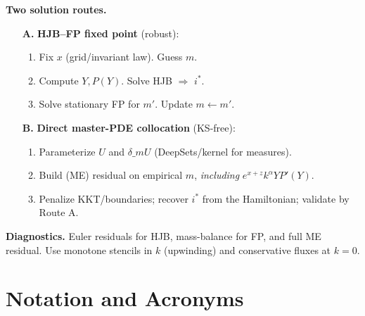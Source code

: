 \documentclass[11pt,letterpaper,oneside]{article}
\numberwithin{equation}{section}
\newcommand{\1}{\mathbf{1}}
\newcommand{\dmU}{\delta\_m U}
\begin{document}
\begin{tcolorbox}[didacticstyle]
\textbf{Two solution routes.}
\begin{enumerate}[leftmargin=1.25em]
\item[\textbf{A.}] \textbf{HJB--FP fixed point} (robust):
\begin{enumerate}[leftmargin=1em,label*=\arabic*.]
\item Fix $x$ (grid/invariant law). Guess $m$.
\item Compute $Y,P(Y)$. Solve HJB $\Rightarrow$ $i^*$.
\item Solve stationary FP for $m'$. Update $m\leftarrow m'$.
\end{enumerate}
\item[\textbf{B.}] \textbf{Direct master-PDE collocation} (KS-free):
\begin{enumerate}[leftmargin=1em,label*=\arabic*.]
\item Parameterize $U$ and $\dmU$ (DeepSets/kernel for measures).
\item Build (ME) residual on empirical $m$, \emph{including} $e^{x+z}k^\alpha Y P'(Y)$.
\item Penalize KKT/boundaries; recover $i^*$ from the Hamiltonian; validate by Route A.
\end{enumerate}
\end{enumerate}

\textbf{Diagnostics.} Euler residuals for HJB, mass-balance for FP, and full ME residual. Use monotone stencils in $k$ (upwinding) and conservative fluxes at $k=0$.
\end{tcolorbox}

\section{Notation and Acronyms}
\end{document}
